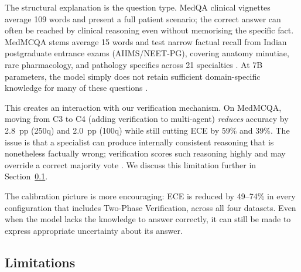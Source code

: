 \documentclass[10pt]{article}
\begin{document}
The structural explanation is the question type.  MedQA clinical vignettes
average 109 words and present a full patient scenario; the correct answer can
often be reached by clinical reasoning even without memorising the specific
fact.  MedMCQA stems average 15 words and test narrow factual recall from
Indian postgraduate entrance exams (AIIMS/NEET-PG), covering anatomy minutiae,
rare pharmacology, and pathology specifics across 21 specialties
\citep{pal2022medmcqa}.  At 7B parameters, the model simply does not retain
sufficient domain-specific knowledge for many of these questions
\citep{singh2025neet, kadavath2022language}.

This creates an interaction with our verification mechanism.  On MedMCQA,
moving from C3 to C4 (adding verification to multi-agent) \emph{reduces}
accuracy by 2.8~pp (250q) and 2.0~pp (100q) while still cutting ECE by 59\%
and 39\%.  The issue is that a specialist can produce internally consistent
reasoning that is nonetheless factually wrong; verification scores such
reasoning highly and may override a correct majority vote
\citep{wu2024uncertainty}.  We discuss this limitation further in
Section~\ref{sec:limitations}.

The calibration picture is more encouraging: ECE is reduced by 49--74\% in
every configuration that includes Two-Phase Verification, across all four
datasets.  Even when the model lacks the knowledge to answer correctly, it can
still be made to express appropriate uncertainty about its answer.

\subsection{Limitations}
\label{sec:limitations}
\end{document}
